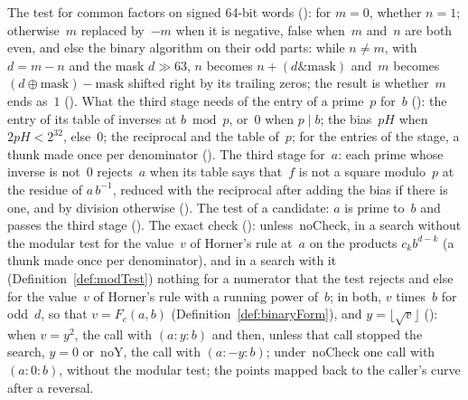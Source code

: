 \begin{definition}\label{def:candidate}
  \leanok
  The test for common factors on signed 64-bit words (): for $m = 0$,
  whether $n = 1$; otherwise~$m$ replaced by~$-m$ when it is negative, false when~$m$ and~$n$ are
  both even, and else the binary algorithm on their odd parts: while $n \ne m$, with $d = m - n$ and
  the mask $d \gg 63$, $n$ becomes $n + (d \mathbin{\&} \mathrm{mask})$ and~$m$ becomes
  $(d \oplus \mathrm{mask}) - \mathrm{mask}$ shifted right by its trailing zeros; the result is
  whether~$m$ ends as~$1$ (). What the third stage needs of the entry of a
  prime~$p$ for~$b$ (): the entry of its table of inverses at $b \bmod p$,
  or~$0$ when $p \mid b$; the bias~$p H$ when $2 p H < 2^{32}$, else~$0$; the reciprocal and the
  table of~$p$; for the entries of the stage, a thunk made once per denominator
  (). The third stage for~$a$: each prime whose inverse is not~$0$
  rejects~$a$ when its table says that~$f$ is not a square modulo~$p$ at the residue of
  $a\, b^{-1}$, reduced with the reciprocal after adding the bias if there is one, and by division
  otherwise (). The test of a candidate: $a$ is prime to~$b$ and passes
  the third stage (). The exact check
  (): unless~$\mathrm{noCheck}$, in a search without the modular
  test for the value~$v$ of Horner's rule at~$a$ on the products $c_k b^{d - k}$ (a thunk made once
  per denominator), and in a search with it (Definition~\ref{def:modTest}) nothing for a numerator
  that the test rejects and else for the value~$v$ of Horner's rule with a running power of~$b$; in
  both, $v$ times~$b$ for odd~$d$, so that $v = F_c(a, b)$ (Definition~\ref{def:binaryForm}), and
  $y = \lfloor \sqrt{v} \rfloor$ (): when $v = y^2$, the call
  with $(a : y : b)$ and then, unless that call stopped the search, $y = 0$ or~$\mathrm{noY}$, the
  call with $(a : -y : b)$; under~$\mathrm{noCheck}$ one call with $(a : 0 : b)$, without the
  modular test; the points mapped back to the caller's curve after a reversal.
\end{definition}

